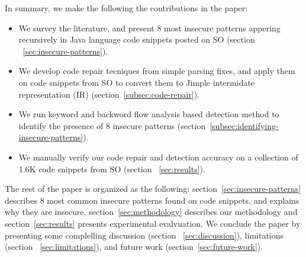    
   In summary, we make the following the contributions in the paper: 
   \begin{itemize}
   \item We survey the literature, and present 8 most insecure patterns appering recursively in Java language code snippets posted on SO (section ~\ref{sec:insecure-patterns}).      
   \item We develop code repair tecniques from simple parsing fixes, and apply them on code snippets from SO to convert them to Jimple intermidate representation (IR) %
   (section~\ref{subsec:code-repair}). 
   \item  We run keyword and backword flow analysis based detection method to identify the presence of 8 insecure patterns (section~\ref{subsec:identifying-insecure-patterns}).
   \item We manually verify our code repair and detection accuracy on a collection of 1.6K code snippets from SO (section ~\ref{sec:results}). 
   \end{itemize}

   The rest of the paper is organized as the following: section~\ref{sec:insecure-patterns} describes 8 most common insecure patterns found on code snippets, and explains why they are insecure, section~\ref{sec:methodology} describes our methodology and section~\ref{sec:results} presents experimental evalvuation. We conclude the paper by presenting some complelling discussion (section ~\ref{sec:discussion}), limitations (section ~\ref{sec:limitations}), and future work (section~\ref{sec:future-work}).

   
